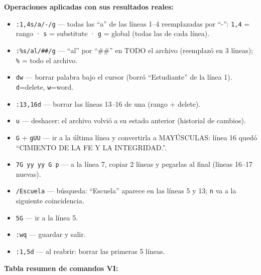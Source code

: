 \textbf{Operaciones aplicadas con sus resultados reales:}

\begin{itemize}
  \item \texttt{:1,4s/a/-/g} --- todas las ``a'' de las líneas 1--4 reemplazadas por ``-'': \texttt{1,4} = rango · \texttt{s} = substitute · \texttt{g} = global (todas las de cada línea).
  \item \texttt{:\%s/al/\#\#/g} --- ``al'' por ``\#\#'' en TODO el archivo (reemplazó en 3 líneas); \texttt{\%} = todo el archivo.
  \item \texttt{dw} --- borrar palabra bajo el cursor (borró ``Estudiante'' de la línea 1). \texttt{d}=delete, \texttt{w}=word.
  \item \texttt{:13,16d} --- borrar las líneas 13--16 de una (rango + delete).
  \item \texttt{u} --- deshacer: el archivo volvió a su estado anterior (historial de cambios).
  \item \texttt{G} + \texttt{gUU} --- ir a la última línea y convertirla a MAYÚSCULAS: línea 16 quedó ``CIMIENTO DE LA FE Y LA INTEGRIDAD.''.
  \item \texttt{7G yy yy G p} --- a la línea 7, copiar 2 líneas y pegarlas al final (líneas 16--17 nuevas).
  \item \texttt{/Escuela} --- búsqueda: ``Escuela'' aparece en las líneas 5 y 13; \texttt{n} va a la siguiente coincidencia.
  \item \texttt{5G} --- ir a la línea 5.
  \item \texttt{:wq} --- guardar y salir.
  \item \texttt{:1,5d} --- al reabrir: borrar las primeras 5 líneas.
\end{itemize}

\textbf{Tabla resumen de comandos VI:}

